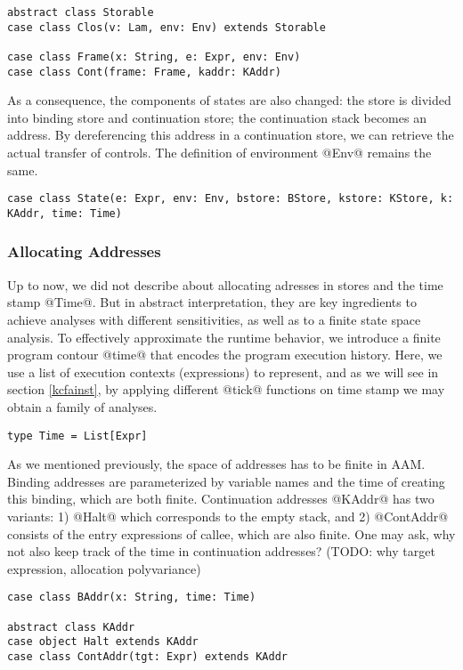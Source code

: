 \documentclass[acmsmall,review,anonymous]{acmart}\settopmatter{printfolios=true,printccs=false,printacmref=false}
\begin{document}
\begin{lstlisting}
abstract class Storable 
case class Clos(v: Lam, env: Env) extends Storable

case class Frame(x: String, e: Expr, env: Env)
case class Cont(frame: Frame, kaddr: KAddr)
\end{lstlisting}

As a consequence, the components of states are also changed: 
the store is divided into binding store and continuation store;
the continuation stack becomes an address.
By dereferencing this address in a continuation store, we can retrieve the 
actual transfer of controls. The definition of environment @Env@
remains the same.

\begin{lstlisting}
case class State(e: Expr, env: Env, bstore: BStore, kstore: KStore, k: KAddr, time: Time)
\end{lstlisting}

\subsubsection{Allocating Addresses}
Up to now, we did not describe about allocating adresses in stores and the time stamp @Time@.
But in abstract interpretation, they are key ingredients to achieve 
analyses with different sensitivities, as well as to a finite state space analysis\cite{Gilray:2016:ACP:2951913.2951936}.
To effectively approximate the runtime behavior, we introduce a finite 
program contour @time@ that encodes the program execution history.
Here, we use a list of execution contexts (expressions) to represent, and
as we will see in section \ref{kcfainst}, by applying different @tick@
functions on time stamp we may obtain a family of analyses.

\begin{lstlisting}
type Time = List[Expr]
\end{lstlisting}

As we mentioned previously, the space of addresses has to be finite in AAM.
Binding addresses are parameterized by variable names and the time of creating this binding,
which are both finite.
Continuation addresses @KAddr@ has two variants: 
1) @Halt@ which corresponds to the empty stack, and
2) @ContAddr@ consists of the entry expressions of callee, which are also
finite.
One may ask, why not also keep track of the time in continuation addresses?
(TODO: why target expression, allocation polyvariance)

\begin{lstlisting}
case class BAddr(x: String, time: Time)

abstract class KAddr
case object Halt extends KAddr
case class ContAddr(tgt: Expr) extends KAddr
\end{lstlisting}
\end{document}

